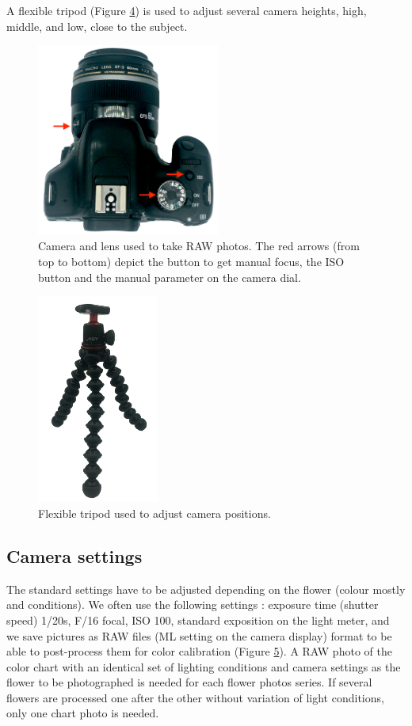 \documentclass[
]{book}
\begin{document}
A flexible tripod (Figure \protect\hyperlink{tripod}{4}) is used to adjust several camera heights, high,
middle, and low, close to the subject.

\begin{figure}
\hypertarget{camera_arrows}{%
\centering
\includegraphics[width=6cm,height=\textheight]{Figures/camera_arrows.png}
\caption{Camera and lens used to take RAW photos. The red arrows (from top to
bottom) depict the button to get manual focus, the ISO button and the
manual parameter on the camera
dial.}\label{camera_arrows}
}
\end{figure}

\begin{figure}
\hypertarget{tripod}{%
\centering
\includegraphics[width=4cm,height=\textheight]{Figures/tripod.png}
\caption{Flexible tripod used to adjust camera
positions.}\label{tripod}
}
\end{figure}

\hypertarget{camera-settings}{%
\subsection{Camera settings}\label{camera-settings}}

The standard settings have to be adjusted depending on the flower
(colour mostly and conditions). We often use the following settings :
exposure time (shutter speed) 1/20s, F/16 focal, ISO 100, standard
exposition on the light meter, and we save pictures as RAW files (ML
setting on the camera display) format to be able to post-process them
for color calibration (Figure \protect\hyperlink{fig:my_label}{5}). A RAW photo of the color chart with an
identical set of lighting conditions and camera settings as the flower
to be photographed is needed for each flower photos series. If several
flowers are processed one after the other without variation of light
conditions, only one chart photo is needed.
\end{document}
